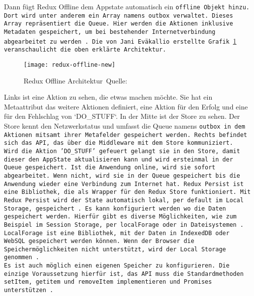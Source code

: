 Dann fügt Redux Offline dem \gls{App}state automatisch ein \tt{offline} Objekt hinzu. Dort wird unter anderem ein Array namens \tt{outbox} verwaltet.
Dieses Array repräsentiert die \gls{Queue}. Hier werden die Aktionen inklusive Metadaten gespeichert, um bei bestehender Internetverbindung abgearbeitet zu werden~\cite{redux-offline-docs}.
Die von Jani Eväkallio erstellte Grafik \ref{fig:redux-offline} veranschaulicht die oben erklärte Architektur.
%
\begin{figure}[h]
  \centering
  \texttt{[image: redux-offline-new]}
  \grayRule
  \caption[Redux Offline]{Redux Offline Architektur~Quelle:~\cite{redux-offline}}
  \label{fig:redux-offline}
\end{figure}
%
Links ist eine Aktion zu sehen, die etwas machen möchte. Sie hat ein Metaattribut das weitere Aktionen definiert, eine Aktion für den Erfolg und eine für den Fehlschlag von `DO\_STUFF`.
In der Mitte ist der Store zu sehen.
Der Store kennt den Netzwerkstatus und umfasst die \gls{Queue} namens \tt{outbox} in dem Aktionen mitsamt ihrer Metafelder gespeichert werden.
Rechts befindet sich das \gls{API}, das über die \gls{Middleware} mit dem Store kommuniziert.\\
Wird die Aktion 'DO\_STUFF' gefeuert gelangt sie in den Store, damit dieser den \gls{App}State aktualisieren kann und wird ersteinmal in der \gls{Queue} gespeichert.
Ist die Anwendung online, wird sie sofort abgearbeitet.
Wenn nicht, wird sie in der \gls{Queue} gespeichert bis die Anwendung wieder eine Verbindung zum Internet hat.
%
%
Redux Persist ist eine Bibliothek, die als Wrapper für den Redux Store funktioniert.
Mit Redux Persist wird der State automatisch lokal, per default im Local Storage, gespeichert~\cite{redux-persist}.
Es kann konfiguriert werden wo die Daten gespeichert werden.
Hierfür gibt es diverse Möglichkeiten, wie zum Beispiel im Session Storage, per localForage oder in Dateisystemen~\cite{redux-persist-gh}.
LocalForage ist eine Bibliothek, mit der Daten in IndexedDB oder WebSQL gespeichert werden können.
Wenn der Browser die Speichermöglichkeiten nicht unterstützt, wird der Local Storage genommen~\cite{localforage}.\\
Es ist auch möglich einen eigenen Speicher zu konfigurieren.
Die einzige Voraussetzung hierfür ist, das \gls{API} muss die Standardmethoden \tt{setItem}, \tt{getitem} und \tt{removeItem} implementieren und Promises unterstützen~\cite{redux-persist-gh}.
%
%
